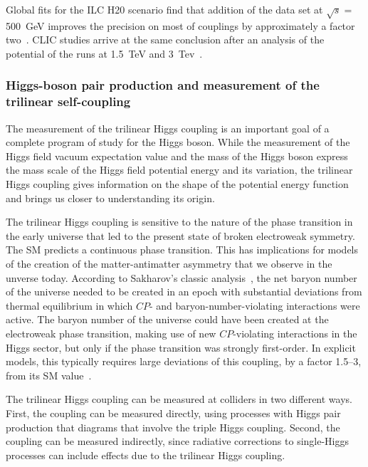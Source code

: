 Global fits for the ILC H20 scenario find that addition of the data
set at $\sqrt{s}=$ 500~GeV improves the precision on most of
couplings by approximately a factor two~\cite{Barklow:2017suo}.
CLIC studies arrive at the same conclusion after an analysis of
the potential of the runs at 1.5~TeV  and
3~Tev~\cite{Abramowicz:2016zbo,Robson:2018zje}.

\subsubsection{Higgs-boson pair production and measurement 
of the trilinear self-coupling}
\label{subsubsec:highE:tripleHiggs}

The measurement of the trilinear Higgs coupling is an important goal
of a complete program of study for the Higgs boson.  While the
measurement of the Higgs field vacuum expectation value and the mass
of the Higgs boson express the mass scale of the Higgs field potential
energy and its variation, the trilinear Higgs coupling gives
information on the shape of the potential energy function and brings
us closer to understanding its origin.

The trilinear Higgs coupling is sensitive to the nature of the phase
transition in the early universe that led to the present state of
broken electroweak symmetry.  
The  SM predicts a continuous phase transition.   This has
implications for models of the creation of the matter-antimatter
asymmetry that we observe in the unverse today. According to
Sakharov's classic analysis~\cite{Sakharov:1967dj}, the net baryon number of the universe
needed to be created in an epoch with substantial deviations from
thermal equilibrium in which $CP$- and baryon-number-violating
interactions were active.    The baryon number of the universe could
have been created at the electroweak phase transition, making use of new
$CP$-violating interactions in the Higgs sector, but only if the phase
transition was strongly first-order.   In explicit models, this
typically requires large deviations of this coupling, by a factor
1.5--3, from its SM value~\cite{Morrissey:2012db}.

The  trilinear Higgs coupling can be measured at colliders in two
different ways.   First, the coupling can be measured directly, using 
processes with Higgs pair production
that  diagrams that involve the triple Higgs coupling.  Second, the
coupling can be measured indirectly, since
radiative corrections to single-Higgs processes can include effects
due to the trilinear Higgs coupling.

